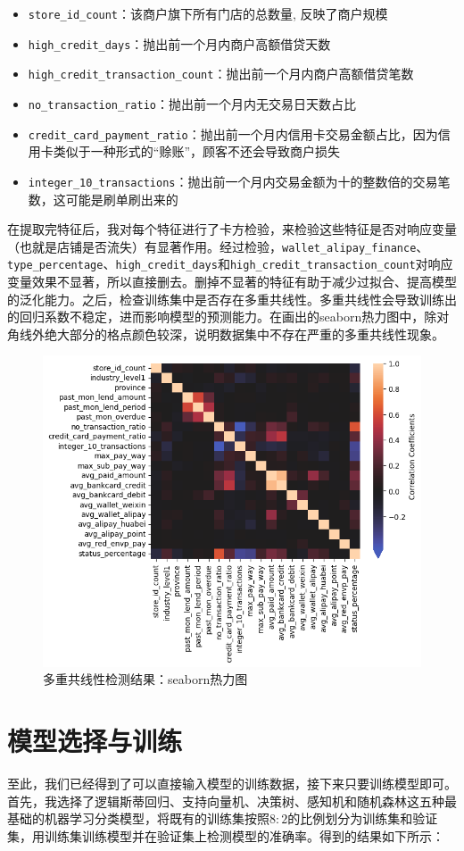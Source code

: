 \documentclass{article}
\begin{document}
\begin{itemize}
    \item \lstinline{store_id_count}：该商户旗下所有门店的总数量, 反映了商户规模
    \item \lstinline{high_credit_days}：抛出前一个月内商户高额借贷天数
    \item \lstinline{high_credit_transaction_count}：抛出前一个月内商户高额借贷笔数
    \item \lstinline{no_transaction_ratio}：抛出前一个月内无交易日天数占比
    \item \lstinline{credit_card_payment_ratio}：抛出前一个月内信用卡交易金额占比，因为信用卡类似于一种形式的“赊账”，顾客不还会导致商户损失
    \item \lstinline{integer_10_transactions}：抛出前一个月内交易金额为十的整数倍的交易笔数，这可能是刷单刷出来的
\end{itemize}
在提取完特征后，我对每个特征进行了卡方检验，来检验这些特征是否对响应变量（也就是店铺是否流失）有显著作用。经过检验，\lstinline{wallet_alipay_finance}、\lstinline{type_percentage}、\lstinline{high_credit_days}和\lstinline{high_credit_transaction_count}对响应变量效果不显著，所以直接删去。删掉不显著的特征有助于减少过拟合、提高模型的泛化能力。之后，检查训练集中是否存在多重共线性。多重共线性会导致训练出的回归系数不稳定，进而影响模型的预测能力。在画出的seaborn热力图中，除对角线外绝大部分的格点颜色较深，说明数据集中不存在严重的多重共线性现象。

\begin{figure}[h]
    \centering
    \includegraphics[width=0.75\linewidth]{img/image03.png}
    \caption{多重共线性检测结果：seaborn热力图}
    \label{fig:enter-label}
\end{figure}

\section{模型选择与训练}
至此，我们已经得到了可以直接输入模型的训练数据，接下来只要训练模型即可。首先，我选择了逻辑斯蒂回归、支持向量机、决策树、感知机和随机森林这五种最基础的机器学习分类模型，将既有的训练集按照$8:2$的比例划分为训练集和验证集，用训练集训练模型并在验证集上检测模型的准确率。得到的结果如下所示：
\end{document}
